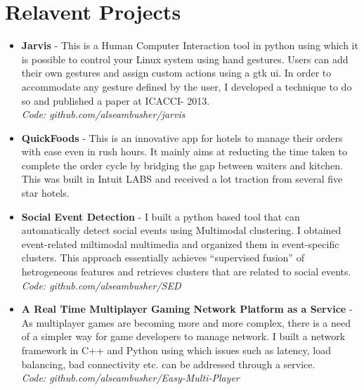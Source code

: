 \documentclass[a4paper]{article} %
\begin{document}
\section{Relavent Projects}
\begin{itemize}
 \item \textbf{Jarvis} - This is a Human Computer Interaction tool in python using which it is possible to control your Linux system using hand gestures. Users can add their own gestures and assign custom actions using a gtk ui. In order to accommodate any gesture defined by the user, I developed a technique to do so and published a paper at ICACCI- 2013. \\
 \textit{Code: github.com/alseambusher/jarvis}
 \item \textbf{QuickFoods} - This is an innovative app for hotels to manage their orders with ease even in rush hours. It mainly aims at reducting the time taken to complete the order cycle by bridging the gap between waiters and kitchen. This was built in Intuit LABS and received a lot traction from several five star hotels.
 \item \textbf{Social Event Detection} - I built a python based tool that can automatically detect social events using Multimodal clustering. I obtained event-related miltimodal multimedia and organized them in event-specific clusters. This approach essentially achieves “supervised fusion” of hetrogeneous features and retrieves clusters that are related to social events.\\
 \textit{Code: github.com/alseambusher/SED}
 \item \textbf{A Real Time Multiplayer Gaming Network Platform as a Service} - As multiplayer games are becoming more and more complex, there is a need of a simpler way for game developers to manage network. I built a network framework in C++ and Python using which issues such as latency, load balancing, bad connectivity etc. can be addressed through a service.\\
 \textit{Code: github.com/alseambusher/Easy-Multi-Player}
\end{itemize}

\end{document}
